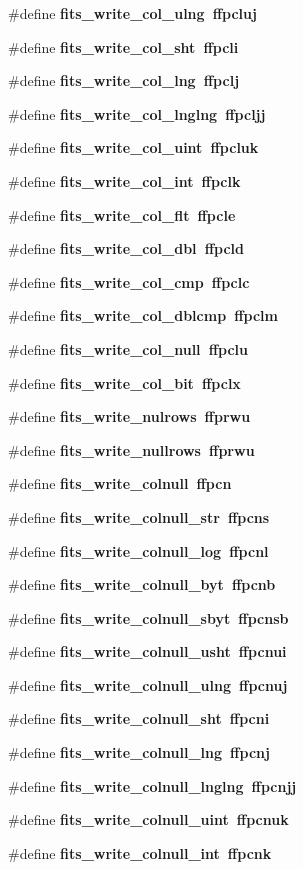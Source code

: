 \begin{CompactItemize}
\item 
\#define \bf{fits\_\-write\_\-col\_\-ulng}~ffpcluj
\item 
\#define \bf{fits\_\-write\_\-col\_\-sht}~ffpcli
\item 
\#define \bf{fits\_\-write\_\-col\_\-lng}~ffpclj
\item 
\#define \bf{fits\_\-write\_\-col\_\-lnglng}~ffpcljj
\item 
\#define \bf{fits\_\-write\_\-col\_\-uint}~ffpcluk
\item 
\#define \bf{fits\_\-write\_\-col\_\-int}~ffpclk
\item 
\#define \bf{fits\_\-write\_\-col\_\-flt}~ffpcle
\item 
\#define \bf{fits\_\-write\_\-col\_\-dbl}~ffpcld
\item 
\#define \bf{fits\_\-write\_\-col\_\-cmp}~ffpclc
\item 
\#define \bf{fits\_\-write\_\-col\_\-dblcmp}~ffpclm
\item 
\#define \bf{fits\_\-write\_\-col\_\-null}~ffpclu
\item 
\#define \bf{fits\_\-write\_\-col\_\-bit}~ffpclx
\item 
\#define \bf{fits\_\-write\_\-nulrows}~ffprwu
\item 
\#define \bf{fits\_\-write\_\-nullrows}~ffprwu
\item 
\#define \bf{fits\_\-write\_\-colnull}~ffpcn
\item 
\#define \bf{fits\_\-write\_\-colnull\_\-str}~ffpcns
\item 
\#define \bf{fits\_\-write\_\-colnull\_\-log}~ffpcnl
\item 
\#define \bf{fits\_\-write\_\-colnull\_\-byt}~ffpcnb
\item 
\#define \bf{fits\_\-write\_\-colnull\_\-sbyt}~ffpcnsb
\item 
\#define \bf{fits\_\-write\_\-colnull\_\-usht}~ffpcnui
\item 
\#define \bf{fits\_\-write\_\-colnull\_\-ulng}~ffpcnuj
\item 
\#define \bf{fits\_\-write\_\-colnull\_\-sht}~ffpcni
\item 
\#define \bf{fits\_\-write\_\-colnull\_\-lng}~ffpcnj
\item 
\#define \bf{fits\_\-write\_\-colnull\_\-lnglng}~ffpcnjj
\item 
\#define \bf{fits\_\-write\_\-colnull\_\-uint}~ffpcnuk
\item 
\#define \bf{fits\_\-write\_\-colnull\_\-int}~ffpcnk
\item 

\end{CompactItemize}
